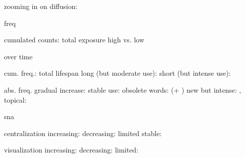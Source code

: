 
zooming in on diffusion:

freq

  cumulated counts: total exposure
    high vs. low

  over time

    cum. freq.: total lifespan
      long (but moderate use): 
      short (but intense use): 

    abs. freq.
      gradual increase: 
      stable use: 
      obsolete words:  (+ )
      new but intense: , 
      topical: 

sna

  centralization
    increasing:
    decreasing:
    limited
    stable: 

  visualization
    increasing: 
    decreasing: 
    limited: 
